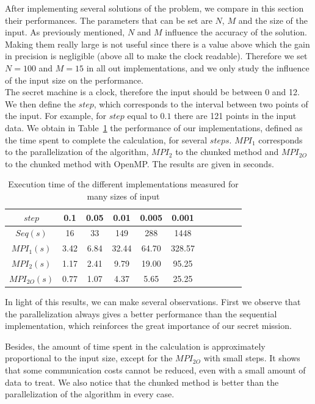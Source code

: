 \documentclass[11pt,a4paper]{article}
\begin{document}
After implementing several solutions of the problem, we compare in this section their performances. The parameters that can be set are $N$, $M$ and the size of the input. As previously mentioned, $N$ and $M$ influence the accuracy of the solution. Making them really large is not useful since there is a value above which the gain in precision is negligible (above all to make the clock readable). Therefore we set $N=100$ and $M=15$ in all out implementations, and we only study the influence of the input size on the performance.\\

The secret machine is a clock, therefore the input should be between 0 and 12. We then define the $step$, which corresponds to the interval between two points of the input. For example, for $step$ equal to $0.1$ there are 121 points in the input data. We obtain in Table~\ref{table:comparison} the performance of our implementations, defined as the time spent to complete the calculation, for several $steps$. $MPI_1$ corresponds to the parallelization of the algorithm, $MPI_2$ to the chunked method and $MPI_{2O}$ to the chunked method with OpenMP. The results are given in seconds.

\begin{table}[h]
\centering
\begin{tabular}{|c|c|c|c|c|c|c|c|c|c|c|}
  \hline
  $step$ & 0.1 & 0.05 & 0.01 & 0.005 & 0.001\\ 
  \hline
  $Seq(s)$ & 16 & 33 & 149 & 288 & 1448\\
  \hline
   $MPI_1(s)$ & 3.42 & 6.84 & 32.44 & 64.70 & 328.57\\
  \hline
   $MPI_2(s)$ & 1.17 & 2.41 & 9.79 & 19.00 & 95.25\\
  \hline
   $MPI_{2O}(s)$ & 0.77 & 1.07 & 4.37 & 5.65 & 25.25\\
  \hline
  \end{tabular}
\caption{\label{table:comparison} Execution time of the different implementations measured for  many sizes of input}
\end{table}

In light of this results, we can make several observations. First we observe that the parallelization always gives a better performance than the sequential implementation, which reinforces the great importance of our secret mission. 

Besides, the amount of time spent in the calculation is approximately proportional to the input size, except for the $MPI_{2O}$ with small steps. It shows that some communication costs cannot be reduced, even with a small amount of data to treat. We also notice that the chunked method is better than the parallelization of the algorithm in every case. 
\end{document}
